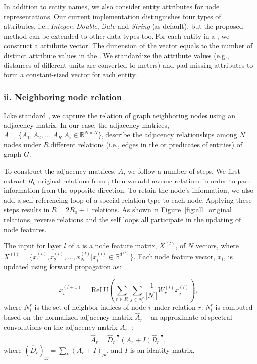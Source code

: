 	
    In addition to entity names, we also consider entity attributes for node representations.
	Our current implementation distinguishes four types of attributes, i.e., \emph{Integer}, \emph{Double}, \emph{Date} and \emph{String}
    (as default), but the proposed method can be extended to other data types too.
%	
	For each entity in a \KG, we construct a attribute vector. The dimension of the vector equals to the number of distinct attribute values in the \KG.
    We standardize the attribute values (e.g., distances of different units are converted to meters) and pad missing attributes to form a constant-sized
    vector for each entity.

 \subsubsection{ii. Neighboring node relation}
 Like standard \RGCNs, we capture the relation of graph neighboring nodes using an adjacency matrix.
 In our case, the adjacency matrices, $A=\{A_1,A_2,...,A_R |A_i \in \mathbb{R}^{N
 \times N} \}$, describe the adjacency relationships among $N$ nodes under $R$ different relations (i.e., edges in the \KG or predicates of entities) of graph $G$.

 To construct the adjacency matrices, $A$, we follow a number of steps. We first extract $R_0$ original
 relations from \KGs, then we add reverse relations in order to pass information from the opposite direction. To retain the node's
 information, we also add a self-referencing loop of a special relation type to each node. Applying these steps results in $R=2R_0+1$ relations. As shown in Figure~\ref{fig:all}, original relations, reverse relations and the self loops all participate in the updating of node features.

 The input for layer $l$ of a \RGCN is a node feature matrix, $X^{(l)}$, of $N$ vectors, where  $X^{(l)} =\{x^{(l)}_1,x^{(l)}_2,...,x^{(l)}_{N}
 |x^{(l)}_{i} \in \mathbb{R}^{d^{(l)}}\}$. Each node feature vector, $x_i$, is updated using forward propagation as:

	\begin{equation}
	x_i^{(l+1)}=\mathrm{ReLU} (\sum\limits_{r \in R}\sum\limits_{j \in N_i^r}\frac{1}{|N_i^r|}W_r^{(l)}x_j^{(l)}),
	\end{equation} where $N_i^r$ is the set of neighbor indices of node $i$ under relation $r$.
    $N_i^r$ is computed based on the normalized adjacency
matrix $\hat A_r$ -- an approximate of spectral convolutions on the adjacency matrix $A_r$~\cite{Kipf2016Semi}:
	\begin{equation}
	\hat A_r=\hat D_r^{- \frac{1}{2}}(A_r+I)\hat D_r^{- \frac{1}{2}},
	\end{equation}
	where $(\hat D_r)_{jj}=\sum_k(A_r+I)_{jk}$, and $I$ is an identity matrix.

